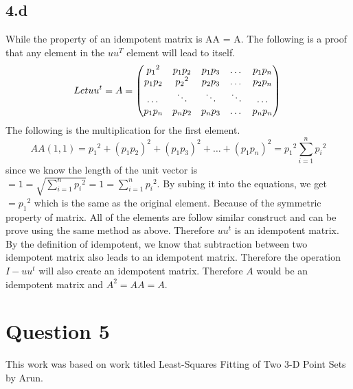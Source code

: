 \documentclass{article}
\begin{document}
\subsection{4.d}
While the property of an idempotent matrix is AA = A. The following is a proof that any element in the $uu^T$ element will lead to itself.
\begin{equation}
Let\space uu^t = A =
\begin{pmatrix}
   {p_1}^2  &  p_1p_2  &  p_1p_3 & \dots & p_1p_n\\
    p_1p_2  &  {p_2}^2  &  p_2p_3 & \dots & p_2p_n\\
    \dots & \ddots & \ddots & \ddots & \dots \\
    p_1p_n &  p_np_2  &  p_np_3 & \dots & p_np_n\\
\end{pmatrix} \\
\end{equation}
The following is the multiplication for the first element.
\begin{equation}
AA(1,1) = {p_1}^2 + (p_1p_2)^2 + (p_1p_3)^2 + \dots + (p_1p_n)^2 = {p_1}^2 \sum_{i = 1}^{n}{{p_i}^2}
\end{equation}
since we know the length of the unit vector is $ = 1 = \sqrt{\sum_{i = 1}^{n}{{p_i}^2}} = 1 = \sum_{i = 1}^{n}{{p_i}^2}$. By subing it into the equations, we get
$ = {p_1}^2$ which is the same as the original element. Because of the symmetric property of matrix. All of the elements are follow similar construct and can be prove using the same method as above. Therefore $uu^t$ is an idempotent matrix. By the definition of idempotent, we know that subtraction between two idempotent matrix also leads to an idempotent matrix. Therefore the operation $I - uu^t$ will also create an idempotent matrix. Therefore $A$ would be an idempotent matrix and $A^2 = AA = A$.


\section{Question 5}
This work was based on work titled
Least-Squares Fitting of Two 3-D Point Sets by Arun.

\end{document}
